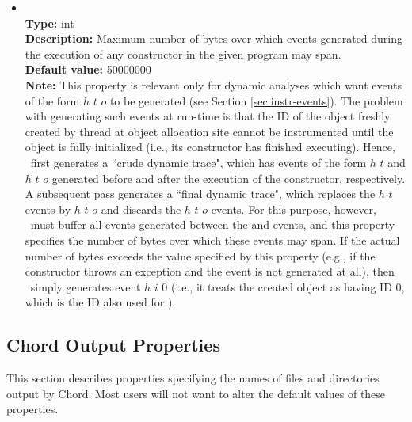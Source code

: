 \begin{itemize}
\item
{} \\
{\bf Type:} int \\
{\bf Description:} Maximum number of bytes over which events generated during the execution of any constructor in the given program may span. \\
{\bf Default value:} 50000000 \\
{\bf Note:} This property is relevant only for dynamic analyses which want events of the form  $h$ $t$ $o$ to be generated (see Section \ref{sec:instr-events}).  The problem with generating such events at run-time is that the ID  of the object freshly created by thread  at object allocation site  cannot be instrumented until the object is fully initialized (i.e., its constructor has finished executing).  Hence, \Chord\ first generates a ``crude dynamic trace", which has events of the form  $h$ $t$ and  $h$ $t$ $o$ generated before and after the execution of the constructor, respectively.  A subsequent pass generates a ``final dynamic trace", which replaces the  $h$ $t$ events by  $h$ $t$ $o$ and discards the  $h$ $t$ $o$ events.  For this purpose, however, \Chord\ must buffer all events generated between the  and  events, and this property specifies the number of bytes over which these events may span.  If the actual number of bytes exceeds the value specified by this property (e.g., if the constructor throws an exception and the  event is not generated at all), then \Chord\ simply generates event  $h$ $i$ $0$ (i.e., it treats the created object as having ID 0, which is the ID also used for ).
\end{itemize}

\subsection{Chord Output Properties}

This section describes properties specifying the names of files and directories output by Chord.
Most users will not want to alter the default values of these properties.

